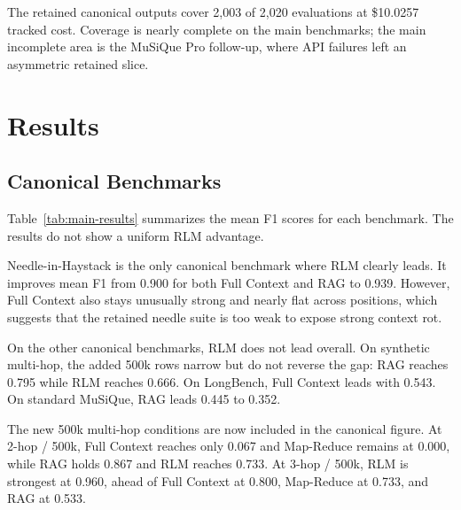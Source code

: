 \documentclass[11pt]{article}
\begin{document}
The retained canonical outputs cover 2,003 of 2,020 evaluations at \$10.0257 tracked cost. Coverage is nearly complete on the main benchmarks; the main incomplete area is the MuSiQue Pro follow-up, where API failures left an asymmetric retained slice.

\section{Results}
\subsection{Canonical Benchmarks}
Table~\ref{tab:main-results} summarizes the mean F1 scores for each benchmark. The results do not show a uniform RLM advantage.

\begin{table}[H]
\centering
\caption{Canonical head-to-head mean F1 by benchmark and method. Best result in each row is bolded. The Pro follow-up is excluded here because the retained RAG and RLM slices are not directly matched.}
\label{tab:main-results}
\end{table}

Needle-in-Haystack is the only canonical benchmark where RLM clearly leads. It improves mean F1 from 0.900 for both Full Context and RAG to 0.939. However, Full Context also stays unusually strong and nearly flat across positions, which suggests that the retained needle suite is too weak to expose strong context rot.

On the other canonical benchmarks, RLM does not lead overall. On synthetic multi-hop, the added 500k rows narrow but do not reverse the gap: RAG reaches 0.795 while RLM reaches 0.666. On LongBench, Full Context leads with 0.543. On standard MuSiQue, RAG leads 0.445 to 0.352.

The new 500k multi-hop conditions are now included in the canonical figure. At 2-hop / 500k, Full Context reaches only 0.067 and Map-Reduce remains at 0.000, while RAG holds 0.867 and RLM reaches 0.733. At 3-hop / 500k, RLM is strongest at 0.960, ahead of Full Context at 0.800, Map-Reduce at 0.733, and RAG at 0.533.
\end{document}
